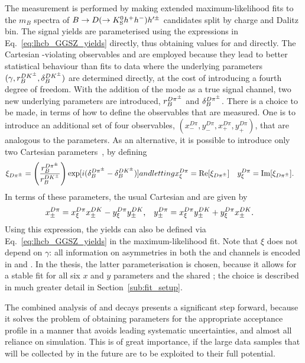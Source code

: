 The measurement is performed by making extended maximum-likelihood fits to the $m_B$ spectra of ${B}\rightarrow{\ensuremath{D}}(\rightarrow{\ensuremath{{K}^0_{\mathrm{S}}}} h^+h^-)h'^\pm$ candidates split by charge and Dalitz bin. The \BtoDK signal yields are parameterised using the expressions in Eq.~\eqref{eq:lhcb_GGSZ_yields} directly, thus obtaining values for \xpmdk and \ypmdk directly. The Cartesian \CP-violating observables \xpm and \ypm are employed because they lead to better statistical behaviour than fits to data where the underlying parameters $(\gamma, r_B^{{D}{{K}^\pm}}, \delta_B^{{D}{{K}^\pm}})$ are determined directly, at the cost of introducing a fourth degree of freedom. With the addition of the \BtoDpi mode as a true signal channel, two new underlying parameters are introduced, $r_B^{{{D}{{\pi}^\pm}}}$ and $\delta_B^{{{D}{{\pi}^\pm}}}$. There is a choice to be made, in terms of how to define the observables that are measured. One is to introduce an additional set of four observables, $(x_-^{D\pi}, y_-^{D\pi}, x_+^{D\pi}, y_+^{D\pi})$, that are analogous to the \BtoDK parameters. As an alternative, it is possible to introduce only two Cartesian parameters~\cite{Tico:2018qmg,JordiXi2}, by defining
\begin{subequations}
\begin{align}
    \xi_{\DPi} = \left(\frac{r_B^{\DPi}}{r_B^{\DK}}\right)\exp [i (\delta_B^{\DPi}-\delta_B^{\DK})]
\end{align}
and letting
\begin{align}
    \xxidpi &= \Re [\xi_{\Dpi}] & \yxidpi &= \Im [\xi_{\Dpi}].
\end{align}
\end{subequations}
In terms of these parameters, the usual Cartesian \xpm and \ypm are given by
\begin{align}\label{eq:xy_from_xi}
    x_\pm^{{D}\pi} &= x_\xi^{{D}\pi}x_\pm^{DK} - y_\xi^{{D}\pi}y_\pm^{DK}, 
    & y_\pm^{{D}\pi} &= x_\xi^{{D}\pi}y_\pm^{DK} + y_\xi^{{D}\pi}x_\pm^{DK}.
\end{align} 
Using this expression, the \BtoDpi yields can also be defined via Eq.~\eqref{eq:lhcb_GGSZ_yields} in the maximum-likelihood fit. Note that $\xi$ does not depend on $\gamma$: all information on \CP asymmetries in both the \BtoDK and \BtoDpi channels is encoded in \xpmdk and \ypmdk. In the thesis, the latter parameterisation is chosen, because it allows for a stable fit for all six $x$ and $y$ parameters and the shared \Fi; the choice is described in much greater detail in Section~\ref{sub:fit_setup}. 

The combined analysis of \BtoDK and \BtoDpi decays presents a significant step forward, because it solves the problem of obtaining \Fi parameters for the appropriate acceptance profile in a manner that avoids leading systematic uncertainties, and almost all reliance on simulation. This is of great importance, if the large data samples that will be collected by \lhcb in the future are to be exploited to their full potential.






